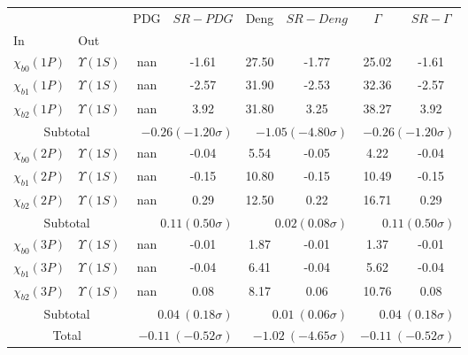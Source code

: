 \begin{tabular}{|l|l|c|c|c|c|c|c|}%
\hline%
&&PDG&$SR-PDG$&Deng&$SR-Deng$&$\Gamma$&$SR-\Gamma$\\%
In&Out&&&&&&\\%
\hline%
$\chi_{b0}(1P)$&$\Upsilon(1S)$&nan&-1.61&27.50&-1.77&25.02&-1.61\\%
$\chi_{b1}(1P)$&$\Upsilon(1S)$&nan&-2.57&31.90&-2.53&32.36&-2.57\\%
$\chi_{b2}(1P)$&$\Upsilon(1S)$&nan&3.92&31.80&3.25&38.27&3.92\\%
\hline%
\hline%
\multicolumn{2}{|c|}{Subtotal}&\multicolumn{2}{|r|}{$-0.26 (-1.20\sigma)$}&\multicolumn{2}{|r|}{$-1.05 (-4.80\sigma)$}&\multicolumn{2}{|r|}{$-0.26 (-1.20\sigma)$}\\%
\hline%
\hline%
$\chi_{b0}(2P)$&$\Upsilon(1S)$&nan&-0.04&5.54&-0.05&4.22&-0.04\\%
$\chi_{b1}(2P)$&$\Upsilon(1S)$&nan&-0.15&10.80&-0.15&10.49&-0.15\\%
$\chi_{b2}(2P)$&$\Upsilon(1S)$&nan&0.29&12.50&0.22&16.71&0.29\\%
\hline%
\hline%
\multicolumn{2}{|c|}{Subtotal}&\multicolumn{2}{|r|}{$0.11 (0.50\sigma)$}&\multicolumn{2}{|r|}{$0.02 (0.08\sigma)$}&\multicolumn{2}{|r|}{$0.11 (0.50\sigma)$}\\%
\hline%
\hline%
$\chi_{b0}(3P)$&$\Upsilon(1S)$&nan&-0.01&1.87&-0.01&1.37&-0.01\\%
$\chi_{b1}(3P)$&$\Upsilon(1S)$&nan&-0.04&6.41&-0.04&5.62&-0.04\\%
$\chi_{b2}(3P)$&$\Upsilon(1S)$&nan&0.08&8.17&0.06&10.76&0.08\\%
\hline%
\hline%
\multicolumn{2}{|c|}{Subtotal}&\multicolumn{2}{|r|}{$0.04~(0.18\sigma)$}&\multicolumn{2}{|r|}{$0.01~(0.06\sigma)$}&\multicolumn{2}{|r|}{$0.04~(0.18\sigma)$}\\%
\hline%
\hline%
\multicolumn{2}{|c|}{Total}&\multicolumn{2}{|r|}{$-0.11~(-0.52\sigma)$}&\multicolumn{2}{|r|}{$-1.02~(-4.65\sigma)$}&\multicolumn{2}{|r|}{$-0.11~(-0.52\sigma)$}\\%
\hline%
\end{tabular}